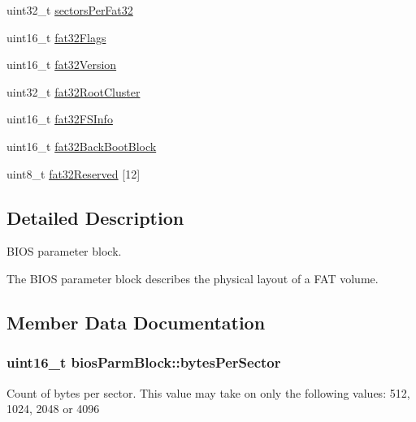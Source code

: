 \begin{DoxyCompactItemize}
uint32\+\_\+t \hyperlink{structbios_parm_block_ad80429df03a6b80f79b18cb6e1008d64}{sectors\+Per\+Fat32}
\item 
uint16\+\_\+t \hyperlink{structbios_parm_block_a626ac3dc473d764688b8171916eecf44}{fat32\+Flags}
\item 
uint16\+\_\+t \hyperlink{structbios_parm_block_abad4f6f0c14dad9f5b7d43de94e685e8}{fat32\+Version}
\item 
uint32\+\_\+t \hyperlink{structbios_parm_block_a77ca01bd99f746e05dd872cbd2979937}{fat32\+Root\+Cluster}
\item 
uint16\+\_\+t \hyperlink{structbios_parm_block_a25ea392d8284e6c1d007cb8fcad4b86c}{fat32\+F\+S\+Info}
\item 
uint16\+\_\+t \hyperlink{structbios_parm_block_a7a4e93790b6e66f090c1551020b099bd}{fat32\+Back\+Boot\+Block}
\item 
uint8\+\_\+t \hyperlink{structbios_parm_block_a351f87fe3446b1a71963a30bbdc23218}{fat32\+Reserved} \mbox{[}12\mbox{]}
\end{DoxyCompactItemize}


\subsection{Detailed Description}
B\+I\+O\+S parameter block. 

The B\+I\+O\+S parameter block describes the physical layout of a F\+A\+T volume. 

\subsection{Member Data Documentation}
\hypertarget{structbios_parm_block_aec24d316af486445d55da14cbbfa6bf4}{}
\subsubsection[{bytes\+Per\+Sector}]{\setlength{\rightskip}{0pt plus 5cm}uint16\+\_\+t bios\+Parm\+Block\+::bytes\+Per\+Sector}\label{structbios_parm_block_aec24d316af486445d55da14cbbfa6bf4}
Count of bytes per sector. This value may take on only the following values\+: 512, 1024, 2048 or 4096 \hypertarget{structbios_parm_block_a7a4e93790b6e66f090c1551020b099bd}{}
